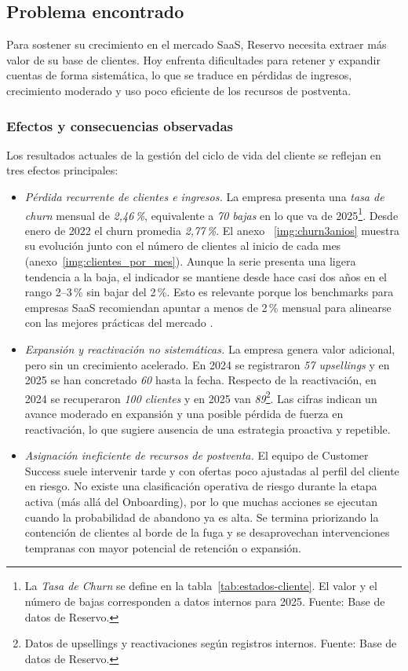 \subsection{Problema encontrado}

Para sostener su crecimiento en el mercado SaaS, Reservo necesita extraer más valor de su base de clientes. Hoy enfrenta dificultades para retener y expandir cuentas de forma sistemática, lo que se traduce en pérdidas de ingresos, crecimiento moderado y uso poco eficiente de los recursos de postventa.

\subsubsection{Efectos y consecuencias observadas}

Los resultados actuales de la gestión del ciclo de vida del cliente se reflejan en tres efectos principales:

\begin{itemize}
    \item \textit{Pérdida recurrente de clientes e ingresos.} La empresa presenta una \textit{tasa de churn} mensual de \textit{2{,}46\,\%}, equivalente a \textit{70 bajas} en lo que va de 2025\footnote{La \textit{Tasa de Churn} se define en la tabla~\ref{tab:estados-cliente}. El valor y el número de bajas corresponden a datos internos para 2025. Fuente: Base de datos de Reservo.}. Desde enero de 2022 el churn promedia \textit{2{,}77\,\%}. El anexo ~\ref{img:churn3anios} muestra su evolución junto con el número de clientes al inicio de cada mes (anexo~\ref{img:clientes_por_mes}). Aunque la serie presenta una ligera tendencia a la baja, el indicador se mantiene desde hace casi dos años en el rango 2–3\,\% sin bajar del 2\,\%. Esto es relevante porque los benchmarks para empresas SaaS recomiendan apuntar a menos de 2\,\% mensual para alinearse con las mejores prácticas del mercado \citep{ChartMogul2023ChurnRate}.

    \item \textit{Expansión y reactivación no sistemáticas.} La empresa genera valor adicional, pero sin un crecimiento acelerado. En 2024 se registraron \textit{57 upsellings} y en 2025 se han concretado \textit{60} hasta la fecha. Respecto de la reactivación, en 2024 se recuperaron \textit{100 clientes} y en 2025 van \textit{89}\footnote{Datos de upsellings y reactivaciones según registros internos. Fuente: Base de datos de Reservo.}. Las cifras indican un avance moderado en expansión y una posible pérdida de fuerza en reactivación, lo que sugiere ausencia de una estrategia proactiva y repetible.

    \item \textit{Asignación ineficiente de recursos de postventa.} El equipo de Customer Success suele intervenir tarde y con ofertas poco ajustadas al perfil del cliente en riesgo. No existe una clasificación operativa de riesgo durante la etapa activa (más allá del Onboarding), por lo que muchas acciones se ejecutan cuando la probabilidad de abandono ya es alta. Se termina priorizando la contención de clientes al borde de la fuga y se desaprovechan intervenciones tempranas con mayor potencial de retención o expansión.
\end{itemize}


